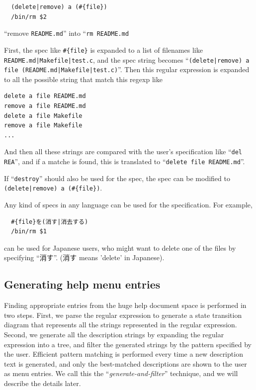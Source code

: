 \documentclass{sigchi}
\begin{document}
\begin{verbatim}
  (delete|remove) a (#{file})
  /bin/rm $2
\end{verbatim}

``remove \verb|README.md|''
into
``\verb|rm README.md|

First, the spec like \verb|#{file}| is expanded to a list of filenames like
\verb+README.md|Makefile|test.c+,
and the spec string becomes
``\verb+(delete|remove) a file (README.md|Makefile|test.c)+''.
Then this regular expression is expanded to all the possible string that match this regexp like
\begin{verbatim}
delete a file README.md
remove a file README.md
delete a file Makefile
remove a file Makefile
...
\end{verbatim}

And then all these strings are compared with the user's specification like
``\verb|del REA|'',
and if a matche is found,
this is translated to
``\verb|delete file README.md|''.

If ``\verb|destroy|'' should also be used for the spec,
the spec can be modified to 
\verb+(delete|remove) a (#{file})+.

Any kind of specs in any language can be used for the specification.
For example,

\begin{verbatim}
  #{file}を(消す|消去する)
  /bin/rm $1
\end{verbatim}

can be  used for Japanese users, who might want to delete
one of the files by specifying ``消す''.
(消す means 'delete' in Japanese).

\subsection{Generating help menu entries}

Finding appropriate entries from the huge help document space is performed in two steps.
First, we parse the regular expression to
generate a state transition diagram that represents all the strings represented
in the regular expression.
Second, we generate all the description strings by expanding the regular expression
into a tree, and filter the generated strings by the pattern specified by the user.
Efficient pattern matching is performed every time a new description text is generated,
and only the best-matched descriptions are shown to the user as menu entries.
We call this the ``\textit{generate-and-filter}'' technique,
and we will describe the details later.
\end{document}
